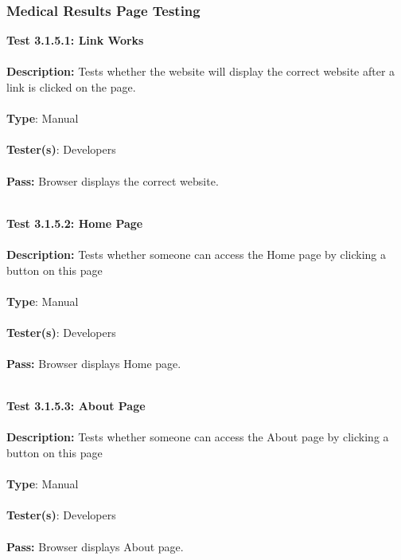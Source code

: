 \documentclass[12pt]{article}
\begin{document}
\subsubsection{Medical Results Page Testing}
\begin{tcolorbox}
\textbf{Test 3.1.5.1: Link Works} \\ \\
\textbf{Description:} Tests whether the website will display the correct website after a link is clicked on the page. \\ \\
\textbf{Type}:  Manual\\ \\
\textbf{Tester(s)}:  Developers\\ \\
\textbf{Pass:} Browser displays the correct website.\\ \\
\end{tcolorbox}

\begin{tcolorbox}
\textbf{Test 3.1.5.2: Home Page} \\ \\
\textbf{Description:} Tests whether someone can access the Home page by clicking a button on this page \\ \\
\textbf{Type}:  Manual\\ \\
\textbf{Tester(s)}:  Developers\\ \\
\textbf{Pass:} Browser displays Home page.\\ \\
\end{tcolorbox}

\begin{tcolorbox}
\textbf{Test 3.1.5.3: About Page} \\ \\
\textbf{Description:} Tests whether someone can access the About page by clicking a button on this page \\ \\
\textbf{Type}:  Manual\\ \\
\textbf{Tester(s)}:  Developers\\ \\
\textbf{Pass:} Browser displays About page.\\ \\
\end{tcolorbox}
\end{document}
